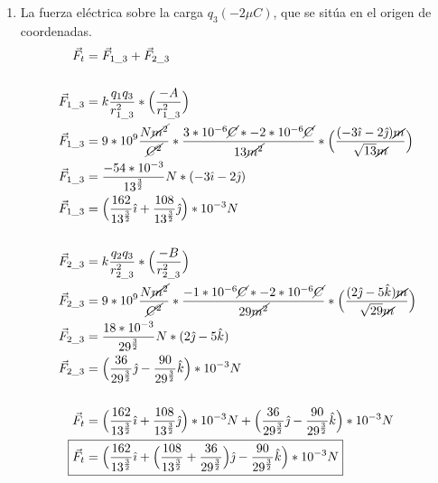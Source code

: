 \documentclass[12pt, twoside]{article}
\begin{document}
\begin{enumerate}
\begin{enumerate}
			\item La fuerza eléctrica sobre la carga $q_3(-2\mu C)$,
				que se sitúa en el origen de coordenadas.
				\begin{align*}
					\vec{F}_t &= \vec{F}_{1\_3}+\vec{F}_{2\_3}\\
					\\
					\vec{F}_{1\_3} &= k \frac{q_1q_3}{r^2_{1\_3}}*
					\Big{(} \frac{-A}{r^2_{1\_3}} \Big{)}\\
					\vec{F}_{1\_3} &= 9*10^9 \frac{N\cancel{m^2}}{\cancel{C^2}}*
					\frac{3*10^{-6}\cancel{C}*-2*10^{-6}\cancel{C}}{13\cancel{m^2}}*
					\Big{(} \frac{(-3\hat{\imath}-2\hat{\jmath})\cancel{m}}{\sqrt{13}\cancel{m}} \Big{)}\\
					\vec{F}_{1\_3} &= \frac{-54*10^{-3}}{13^{ \frac{3}{2} }}N*
					(-3\hat{\imath}-2\hat{\jmath})\\
					\vec{F}_{1\_3} &= \Big{(}
					\frac{162}{13^{ \frac{3}{2} }} \hat{\imath}+
					\frac{108}{13^{ \frac{3}{2} }} \hat{\jmath}
					\Big{)}*10^{-3}N\\
					\\
					\vec{F}_{2\_3} &= k \frac{q_2q_3}{r^2_{2\_3}}*
					\Big{(} \frac{-B}{r^2_{2\_3}} \Big{)}\\
					\vec{F}_{2\_3} &= 9*10^9 \frac{N\cancel{m^2}}{\cancel{C^2}}*
					\frac{-1*10^{-6}\cancel{C}*-2*10^{-6}\cancel{C}}{29\cancel{m^2}}*
					\Big{(} \frac{(2\hat{\jmath}-5\hat{k})\cancel{m}}{\sqrt{29}\cancel{m}} \Big{)}\\
					\vec{F}_{2\_3} &= \frac{18*10^{-3}}{29^{ \frac{3}{2} }} N*
					(2\hat{\jmath}-5\hat{k})\\
					\vec{F}_{2\_3} &= \Big{(}
					\frac{36}{29^{ \frac{3}{2} }}\hat{\jmath} -
					\frac{90}{29^{ \frac{3}{2} }}\hat{k}
					\Big{)}*10^{-3}N\\
					\\
					\vec{F}_t &= \Big{(}
					\frac{162}{13^{ \frac{3}{2} }} \hat{\imath}+
					\frac{108}{13^{ \frac{3}{2} }} \hat{\jmath}
					\Big{)}*10^{-3}N+
					\Big{(}
					\frac{36}{29^{ \frac{3}{2} }}\hat{\jmath} -
					\frac{90}{29^{ \frac{3}{2} }}\hat{k}
					\Big{)}*10^{-3}N\\
					\Aboxed{
						\vec{F}_t &= \Big{(}
						\frac{162}{13^{ \frac{3}{2} }} \hat{\imath}+
						\Big{(}
						\frac{108}{13^{ \frac{3}{2} }}+
						\frac{36}{29^{ \frac{3}{2} }}
						\Big{)}\hat{\jmath}-
						\frac{90}{29^{ \frac{3}{2} }}\hat{k}
						\Big{)}*10^{-3}N
					}
				\end{align*}
		\end{enumerate}


\end{enumerate}
\end{document}
